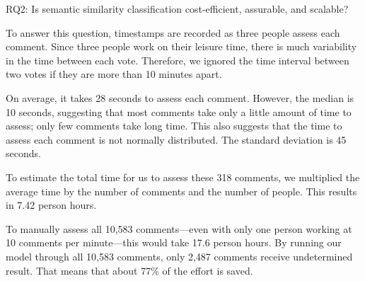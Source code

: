 





\begin{ResearchQuestions}
\item[RQ2:] Is semantic similarity classification cost-efficient, assurable, and scalable?
\end{ResearchQuestions}

To answer this question, timestamps are recorded as three people assess each comment.
Since three people work on their leisure time, there is much variability in the time between each vote.
Therefore, we ignored the time interval between two votes if they are more than 10 minutes apart.

On average, it takes 28 seconds to assess each comment.
However, the median is 10 seconds, suggesting that most comments take only a little amount of time to assess; only few comments take long time.
This also suggests that the time to assess each comment is not normally distributed.
The standard deviation is 45 seconds.

To estimate the total time for us to assess these 318 comments,
we multiplied the average time by the number of comments and the number of people.
This results in 7.42 person hours.

To manually assess all 10,583 comments---even with only one person working at 10 comments per minute---this would take 17.6 person hours.
By running our model through all 10,583 comments, only 2,487 comments receive undetermined result.
That means that about 77\% of the effort is saved.

















